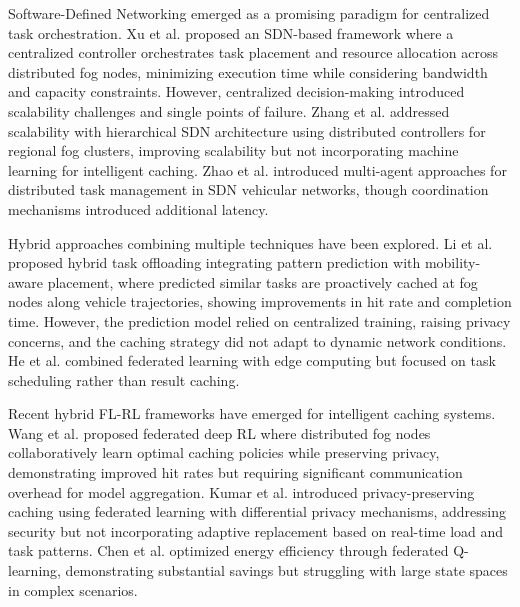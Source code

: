 Software-Defined Networking emerged as a promising paradigm for centralized task orchestration. Xu et al. \cite{xu2018software} proposed an SDN-based framework where a centralized controller orchestrates task placement and resource allocation across distributed fog nodes, minimizing execution time while considering bandwidth and capacity constraints. However, centralized decision-making introduced scalability challenges and single points of failure. Zhang et al. \cite{zhang2019sdn} addressed scalability with hierarchical SDN architecture using distributed controllers for regional fog clusters, improving scalability but not incorporating machine learning for intelligent caching. Zhao et al. \cite{zhao2024distributed} introduced multi-agent approaches for distributed task management in SDN vehicular networks, though coordination mechanisms introduced additional latency.

Hybrid approaches combining multiple techniques have been explored. Li et al. \cite{li2020hybrid} proposed hybrid task offloading integrating pattern prediction with mobility-aware placement, where predicted similar tasks are proactively cached at fog nodes along vehicle trajectories, showing improvements in hit rate and completion time. However, the prediction model relied on centralized training, raising privacy concerns, and the caching strategy did not adapt to dynamic network conditions. He et al. \cite{he2021intelligent} combined federated learning with edge computing but focused on task scheduling rather than result caching.

Recent hybrid FL-RL frameworks have emerged for intelligent caching systems. Wang et al. \cite{wang2024federated} proposed federated deep RL where distributed fog nodes collaboratively learn optimal caching policies while preserving privacy, demonstrating improved hit rates but requiring significant communication overhead for model aggregation. Kumar et al. \cite{kumar2024privacy} introduced privacy-preserving caching using federated learning with differential privacy mechanisms, addressing security but not incorporating adaptive replacement based on real-time load and task patterns. Chen et al. \cite{chen2024energy} optimized energy efficiency through federated Q-learning, demonstrating substantial savings but struggling with large state spaces in complex scenarios.

